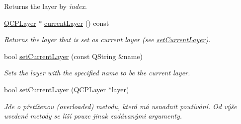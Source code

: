 \begin{DoxyCompactItemize}
\begin{DoxyCompactList}
Returns the layer by {\itshape index}. \end{DoxyCompactList}\item 
\hypertarget{classQCustomPlot_af73057345656cbd1463454982d808b00}{}\hyperlink{classQCPLayer}{Q\+C\+P\+Layer} $\ast$ \hyperlink{classQCustomPlot_af73057345656cbd1463454982d808b00}{current\+Layer} () const \label{classQCustomPlot_af73057345656cbd1463454982d808b00}

\begin{DoxyCompactList}\small\item\em Returns the layer that is set as current layer (see \hyperlink{classQCustomPlot_a73a6dc47c653bb6f8f030abca5a11852}{set\+Current\+Layer}). \end{DoxyCompactList}\item 
bool \hyperlink{classQCustomPlot_a73a6dc47c653bb6f8f030abca5a11852}{set\+Current\+Layer} (const Q\+String \&name)
\begin{DoxyCompactList}\small\item\em Sets the layer with the specified {\itshape name} to be the current layer. \end{DoxyCompactList}\item 
bool \hyperlink{classQCustomPlot_a23a4d3cadad1a0063c5fe19aac5659e6}{set\+Current\+Layer} (\hyperlink{classQCPLayer}{Q\+C\+P\+Layer} $\ast$\hyperlink{classQCustomPlot_aac492da01782820454e9136a8db28182}{layer})
\begin{DoxyCompactList}\small\item\em Jde o přetíženou (overloaded) metodu, která má usnadnit používání. Od výše uvedené metody se liší pouze jinak zadávanými argumenty.


\end{DoxyCompactList}
\end{DoxyCompactItemize}
